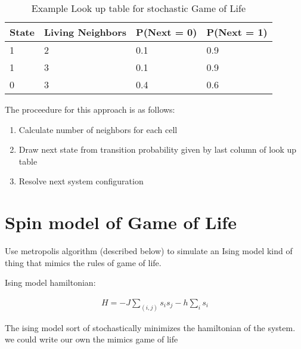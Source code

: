 \documentclass[12pt]{article}
\begin{document}
\begin{table}[h]
\centering
\caption{Example Look up table for stochastic Game of Life}
    \begin{tabular}{|l|l|l|l|} 
    \hline
    State & Living Neighbors & P(Next = 0) & P(Next = 1)  \\ 
    \hline
    1     & 2                & 0.1         & 0.9          \\ 
    \hline
    1     & 3                & 0.1         & 0.9          \\ 
    \hline
    0     & 3                & 0.4         & 0.6          \\
    \hline
    \end{tabular}
\end{table}

The proceedure for this approach is as follows:
\begin{enumerate}
    \item Calculate number of neighbors for each cell
    \item Draw next state from transition probability given by last column of
    look up table
    \item Resolve next system configuration
\end{enumerate}

\section{Spin model of Game of Life}

Use metropolis algorithm (described below) to simulate an Ising model kind of
thing that mimics the rules of game of life.

Ising model hamiltonian:

\begin{align}
    H = -J \sum_{(i,j)} s_i s_j - h \sum_i s_i
\end{align}

The ising model sort of stochastically minimizes the hamiltonian of the system.
we could write our own the mimics game of life

\printbibliography
\end{document}
